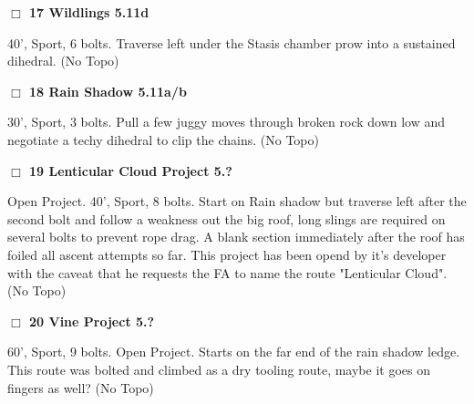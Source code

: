 \begin{multicols}{2}
\needspace{2em}
\label{rt:Wildlings}
\colorbox{RoyalBlue!20}{
\parbox{0.95\linewidth}{
\hspace{-1ex}\textbf{$\Box$
17 Wildlings 5.11d  
}}}
\begin{adjustwidth}{1.3em}{}			

40', Sport, 6 bolts. Traverse left under the Stasis chamber prow into a sustained dihedral.
  (No Topo)
\end{adjustwidth}




\needspace{2em}
\label{rt:Rain Shadow}
\colorbox{RoyalBlue!20}{
\parbox{0.95\linewidth}{
\hspace{-1ex}\textbf{$\Box$
18 Rain Shadow 5.11a/b  
}}}
\begin{adjustwidth}{1.3em}{}			

30', Sport, 3 bolts. Pull a few juggy moves through broken rock down low and negotiate a techy dihedral to clip the chains.
  (No Topo)
\end{adjustwidth}




\needspace{2em}
\label{rt:Lenticular Cloud Project}
\colorbox{black!20}{
\parbox{0.95\linewidth}{
\hspace{-1ex}\textbf{$\Box$
19 Lenticular Cloud Project 5.?  
}}}
\begin{adjustwidth}{1.3em}{}			

Open Project. 40', Sport, 8 bolts. Start on Rain shadow but traverse left after the second bolt and follow a weakness out the big roof, long slings are required on several bolts to prevent rope drag. A blank section immediately after the roof has foiled all ascent attempts so far. This project has been opend by it's developer with the caveat that he requests the FA to name the route "Lenticular Cloud".
  (No Topo)
\end{adjustwidth}




\needspace{2em}
\label{rt:Vine Project}
\colorbox{black!20}{
\parbox{0.95\linewidth}{
\hspace{-1ex}\textbf{$\Box$
20 Vine Project 5.?  
}}}
\begin{adjustwidth}{1.3em}{}			

60', Sport, 9 bolts. Open Project. Starts on the far end of the rain shadow ledge. This route was bolted and climbed as a dry tooling route, maybe it goes on fingers as well?
  (No Topo)
\end{adjustwidth}






\end{multicols}
